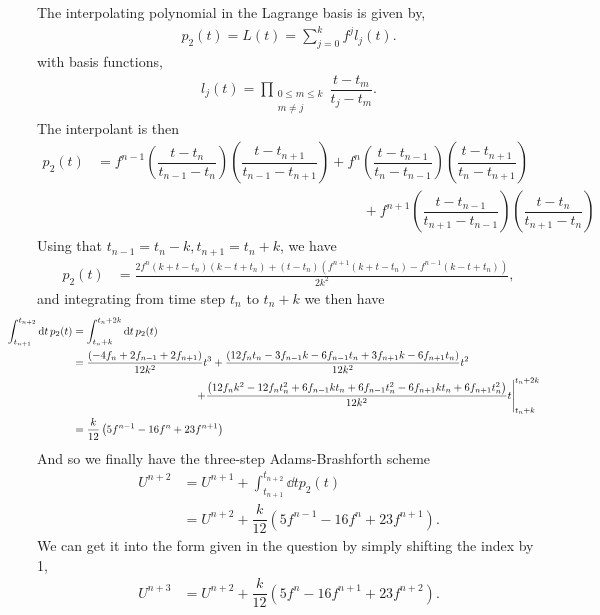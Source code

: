 \documentclass[12pt]{article}
\begin{document}
The interpolating polynomial in the Lagrange basis is given by, 
\begin{align}
	p_{2}(t) = L(t) = \sum_{j=0}^{k}f^{j}l_{j}(t).
\end{align}
with basis functions,
\begin{align}
	l_{j}(t) = \prod_{\substack{0\le m\le k \\ m\neq j}}\dfrac{t-t_{m}}{t_{j}-t_{m}}.
\end{align}
The interpolant is then
\begin{align}
	p_{2}(t) &= f^{n-1}\left(\dfrac{t-t_{n}}{t_{n-1}-t_{n}}\right)\left(\dfrac{t-t_{n+1}}{t_{n-1}-t_{n+1}}\right) +  f^{n}\left(\dfrac{t-t_{n-1}}{t_{n}-t_{n-1}}\right)\left(\dfrac{t-t_{n+1}}{t_{n}-t_{n+1}}\right) \nonumber\\
	&\hspace{8cm}+ 
	f^{n+1}\left(\dfrac{t-t_{n-1}}{t_{n+1}-t_{n-1}}\right)\left(\dfrac{t-t_{n}}{t_{n+1}-t_{n}}\right)
\end{align}
Using that $t_{n-1}=t_{n}-k,t_{n+1}=t_{n}+k$, we have
\begin{align}
	p_{2}(t) &= \frac{2f^{n}(k+t-t_{n}) (k-t+t_{n})+(t-t_{n}) (f^{n+1}(k+t-t_{n})-f^{n-1}(k-t+t_{n}))}{2 k^2},
\end{align}
and integrating from time step $t_{n}$ to $t_{n}+k$ we then have
\begin{subequations}
	\begin{align}
		\hspace{-1cm}\int_{t_{n+1}}^{t_{n+2}}\dd{t}p_{2}(t) &= \int_{t_{n}+k}^{t_{n}+2k}\dd{t}p_{2}(t)\\
		&= \frac{(-4f_{n}+2f_{n-1}+2f_{n+1})}{12k^2}t^3 +\frac{(12f_{n}
		t_{n}-3f_{n-1}k-6f_{n-1}t_{n}+3f_{n+1}k-6f_{n+1}t_{n})}{12 k^2}t^2\nonumber \\ 
		&\hspace{4cm}\left.+\frac{\left(12f_{n}k^2-12f_{n}t_{n}^2+6
		f_{n-1} k t_{n}+6 f_{n-1} t_{n}^2-6f_{n+1}k t_{n}+6
		f_{n+1}t_{n}^2\right)}{12 k^2}t\right|_{t_{n}+k}^{t_{n}+2k}\\
		&= \dfrac{k}{12}\left(5f^{n-1}-16f^{n}+23f^{n+1}\right)
	\end{align}
\end{subequations}
And so we finally have the three-step Adams-Brashforth scheme
\begin{subequations}
	\begin{align}
		U^{n+2} &= U^{n+1} + \int_{t_{n+1}}^{t_{n+2}}\dd{t}p_{2}(t)\\
		&= U^{n+2} + \dfrac{k}{12}\left(5f^{n-1}-16f^{n}+23f^{n+1}\right).
	\end{align}
\end{subequations}
We can get it into the form given in the question by simply shifting the index by 1, 
\begin{align}
	U^{n+3} &= U^{n+2} + \dfrac{k}{12}\left(5f^{n}-16f^{n+1}+23f^{n+2}\right).
\end{align}
\end{document}
